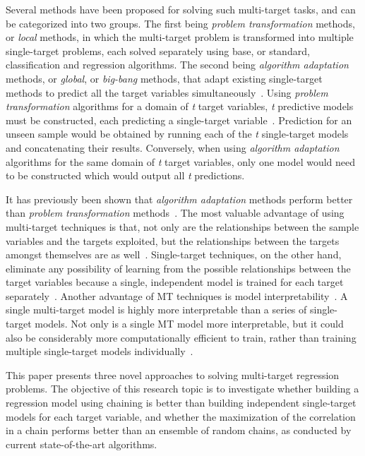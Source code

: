 \documentclass[preprint,12pt]{elsarticle}
\begin{document}
Several methods have been proposed for solving such multi-target tasks, and can be categorized into two groups. The first being \textit{problem transformation} methods, or \textit{local} methods, in which the multi-target problem is transformed into multiple single-target problems, each solved separately using base, or standard, classification and regression algorithms. The second being \textit{algorithm adaptation} methods, or \textit{global}, or \textit{big-bang} methods, that adapt existing single-target methods to predict all the target variables simultaneously~\cite{Borchani2015,Kocev2015}.
Using \textit{problem transformation} algorithms for a domain of \textit{t} target variables, \textit{t} predictive models must be constructed, each predicting a single-target variable~\cite{Kocev2015}. Prediction for an unseen sample would be obtained by running each of the \textit{t} single-target models and concatenating their results. Conversely, when using \textit{algorithm adaptation} algorithms for the same domain of \textit{t} target variables, only one model would need to be constructed which would output all \textit{t} predictions.

It has previously been shown that \textit{algorithm adaptation} methods perform better than \textit{problem transformation} methods~\cite{Kocev2015,Spyromitros2014}. The most valuable advantage of using multi-target techniques is that, not only are the relationships between the sample variables and the targets exploited, but the relationships between the targets amongst themselves are as well~\cite{Baxter1997,Caruana1997}. Single-target techniques, on the other hand, eliminate any possibility of learning from the possible relationships between the target variables because a single, independent model is trained for each target separately~\cite{BenDavic2003}. Another advantage of MT techniques is model interpretability~\cite{Aho2012,Xiong2014}. A single multi-target model is highly more interpretable than a series of single-target models. Not only is a single MT model more interpretable, but it could also be considerably more computationally efficient to train, rather than training multiple single-target models individually~\cite{Appice2014}. 

This paper presents three novel approaches to solving multi-target regression problems. The objective of this research topic is to investigate whether building a regression model using chaining is better than building independent single-target models for each target variable, and whether the maximization of the correlation in a chain performs better than an ensemble of random chains, as conducted by current state-of-the-art algorithms. 
\end{document}
